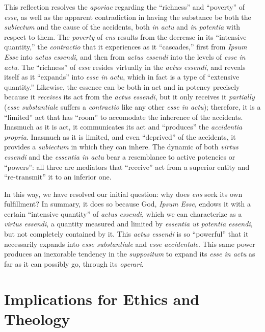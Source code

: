 This reflection resolves the \emph{aporiae} regarding the ``richness'' and ``poverty'' of \emph{esse}, as well as the apparent contradiction in having the substance be both the \emph{subiectum} and the cause of the accidents, both \emph{in actu} and \emph{in potentia} with respect to them. The \emph{poverty} of \emph{ens} results from the decrease in its ``intensive quantity,'' the \emph{contractio} that it experiences as it ``cascades,'' first from \emph{Ipsum Esse} into \emph{actus essendi}, and then from \emph{actus essendi} into the levels of \emph{esse in actu}. The ``richness'' of \emph{esse} resides virtually in the \emph{actus essendi}, and reveals itself as it ``expands'' into \emph{esse in actu}, which in fact is a type of ``extensive quantity.'' Likewise, the essence can be both in act and in potency precisely because it \emph{receives} its act from the \emph{actus essendi}, but it only receives it \emph{partially} (\emph{esse substantiale} suffers a \emph{contractio} like any other \emph{esse in actu}); therefore, it is a ``limited'' act that has ``room'' to accomodate the inherence of the accidents. Inasmuch as it is act, it communicates its act and ``produces'' the \emph{accidentia propria}. Inasmuch as it is limited, and even ``deprived'' of the accidents, it provides a \emph{subiectum} in which they can inhere. The dynamic of both \emph{virtus essendi} and the \emph{essentia in actu} bear a resemblance to active potencies or ``powers'': all three are mediators that ``receive'' act from a superior entity and ``re-transmit'' it to an inferior one.

In this way, we have resolved our initial question: why does \emph{ens} seek its own fulfillment? In summary, it does so because God, \emph{Ipsum Esse}, endows it with a certain ``intensive quantity'' of \emph{actus essendi}, which we can characterize as a \emph{virtus essendi}, a quantity measured and limited by \emph{essentia ut potentia essendi}, but not completely contained by it. This \emph{actus essendi} is so ``powerful'' that it necessarily expands into \emph{esse substantiale} and \emph{esse accidentale}. This same power produces an inexorable tendency in the \emph{suppositum} to expand its \emph{esse in actu} as far as it can possibly go, through its \emph{operari}. 


\section{Implications for Ethics and Theology}

